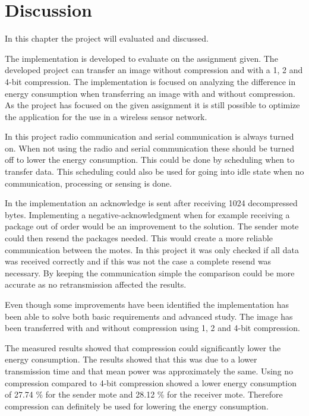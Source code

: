 \chapter{Discussion}
\label{chp:disc}

In this chapter the project will evaluated and discussed.

The implementation is developed to evaluate on the assignment given. The developed project can transfer an image without compression and with a 1, 2 and 4-bit compression. The implementation is focused on analyzing the difference in energy consumption when transferring an image with and without compression. As the project has focused on the given assignment it is still possible to optimize the application for the use in a wireless sensor network.  

In this project radio communication and serial communication is always turned on. When not using the radio and serial communication these should be turned off to lower the energy consumption. This could be done by scheduling when to transfer data. This scheduling could also be used for going into idle state when no communication, processing or sensing is done.

In the implementation an acknowledge is sent after receiving 1024 decompressed bytes. Implementing a negative-acknowledgment when for example receiving a package out of order would be an improvement to the solution. The sender mote could then resend the packages needed. This would create a more reliable communication between the motes. In this project it was only checked if all data was received correctly and if this was not the case a complete resend was necessary. By keeping the communication simple the comparison could be more accurate as no retransmission affected the results.

Even though some improvements have been identified the implementation has been able to solve both basic requirements and advanced study. The image has been transferred with and without compression using 1, 2 and 4-bit compression. 

The measured results showed that compression could significantly lower the energy consumption. The results showed that this was due to a lower transmission time and that  mean power was approximately the same. Using no compression compared to 4-bit compression showed a lower energy consumption of 27.74 \% for the sender mote and 28.12 \% for the receiver mote. Therefore compression can definitely be used for lowering the energy consumption.


